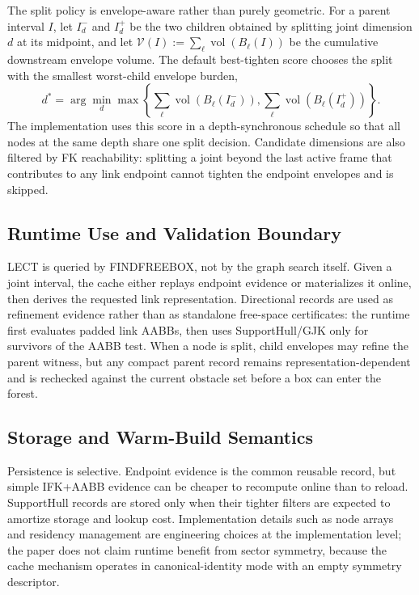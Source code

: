 \documentclass[journal]{IEEEtran}
\DeclareRobustCommand{\textsc}[1]{\textnormal{\MakeUppercase{#1}}}
\begin{document}
The split policy is envelope-aware rather than purely geometric. For a parent
interval $I$, let $I_d^{-}$ and $I_d^{+}$ be the two children obtained by
splitting joint dimension $d$ at its midpoint, and let
$\mathcal{V}(I) := \sum_{\ell} \operatorname{vol}(B_\ell(I))$ be the cumulative
downstream envelope volume. The default best-tighten score chooses the split
with the smallest worst-child envelope burden,
\[
d^* = \arg\min_d
\max\!\left\{\sum_{\ell}\operatorname{vol}(B_\ell(I_d^-)),
\sum_{\ell}\operatorname{vol}(B_\ell(I_d^+))\right\}.
\]
The implementation uses this score in a depth-synchronous schedule so that all
nodes at the same depth share one split decision. Candidate dimensions are also
filtered by FK reachability: splitting a joint beyond the last active frame that
contributes to any link endpoint cannot tighten the endpoint envelopes
and is skipped.

\subsection{Runtime Use and Validation Boundary}

LECT is queried by \textsc{FindFreeBox}, not by the graph search itself. Given a
joint interval, the cache either replays endpoint evidence or materializes it
online, then derives the requested link representation. Directional records are
used as refinement evidence rather than as standalone free-space certificates:
the runtime first evaluates padded link AABBs, then uses SupportHull/GJK only
for survivors of the AABB test. When a node is split, child
envelopes may refine the parent witness, but any compact parent record remains
representation-dependent and is rechecked against the current obstacle set
before a box can enter the forest.

\subsection{Storage and Warm-Build Semantics}\label{sec:lect_storage}

Persistence is selective. Endpoint evidence is the common reusable record, but
simple IFK+AABB evidence can be cheaper to recompute online than to reload.
SupportHull records are stored only when their tighter filters are expected to
amortize storage and lookup cost. Implementation details such as
node arrays and residency management are engineering choices at the
implementation level; the paper does not claim runtime benefit from sector
symmetry, because the cache mechanism operates in canonical-identity mode with
an empty symmetry descriptor.
\end{document}
